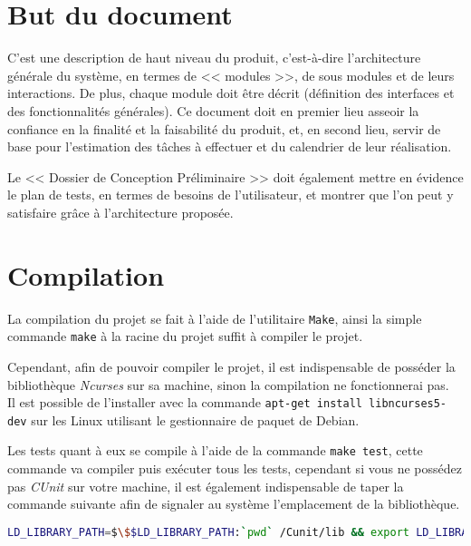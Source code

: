 \documentclass[12pt,a4paper,openany]{book}
\begin{document}
	\setcounter{tocdepth}{2}
	\setcounter{secnumdepth}{3}
	\maketitle
	\tableofcontents
	\newpage
	\section{But du document} %
	C'est une description de haut niveau du produit, c'est-à-dire l'architecture générale du système, en termes de << modules >>, de sous modules et de leurs
	interactions. De plus, chaque module doit être décrit (définition des interfaces et des fonctionnalités générales). Ce document doit en premier lieu asseoir
	la confiance en la finalité et la faisabilité du produit, et, en second lieu, servir de base pour l'estimation des tâches à effectuer et du calendrier de
	leur réalisation.

	Le << Dossier de Conception Préliminaire >> doit également mettre en évidence le plan de tests, en termes de besoins de l'utilisateur, et montrer que l'on peut
	y satisfaire grâce à l'architecture proposée.
	\section{Compilation}
	La compilation du projet se fait à l'aide de l'utilitaire \texttt{Make}, ainsi la simple
	commande \texttt{make} à la racine du projet suffit à compiler le projet.

	Cependant, afin de pouvoir compiler le projet, il est indispensable de posséder la
	bibliothèque \textit{Ncurses} sur sa machine, sinon la compilation ne fonctionnerai pas.\\ 
	Il est possible de l'installer avec la commande \texttt{apt-get install libncurses5-dev}
	sur les Linux utilisant le gestionnaire de paquet de Debian.

	Les tests quant à eux se compile à l'aide de la commande \texttt{make test}, cette
	commande va compiler puis exécuter tous les tests, cependant si vous ne possédez pas
	\textit{CUnit} sur votre machine, il est également indispensable de taper la commande
	suivante afin de signaler au système l'emplacement de la bibliothèque.

	\begin{lstlisting}[language=sh,numbers=none]
LD_LIBRARY_PATH=$\$$LD_LIBRARY_PATH:`pwd` /Cunit/lib && export LD_LIBRARY_PATH		
	\end{lstlisting}
\end{document}

